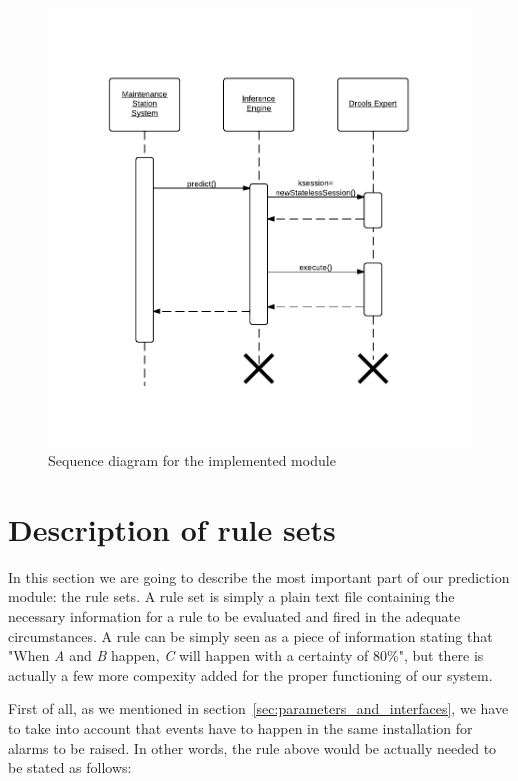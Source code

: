 \documentclass[a4paper,12pt]{article}
\begin{document}
\begin{figure}[hbtp]
\includegraphics[width=\textwidth]{img/prototypeSequence.pdf}
\caption{Sequence diagram for the implemented module} \label{fig:prototypeSequence}
\end{figure}

\section{Description of rule sets}
\label{sec:description_of_rule_sets}
In this section we are going to describe the most important part of our prediction module: the rule sets. A rule set is simply a plain text file containing the necessary information for a rule to be evaluated and fired in the adequate circumstances. A rule can be simply seen as a piece of information stating that "When \emph{A} and \emph{B} happen, \emph{C} will happen with a certainty of 80\%", but there is actually a few more compexity added for the proper functioning of our system.

First of all, as we mentioned in section~\ref{sec:parameters_and_interfaces}, we have to take into account that events have to happen in the same installation for alarms to be raised. In other words, the rule above would be actually needed to be stated as follows:
\end{document}

